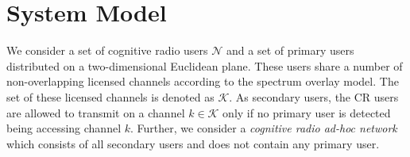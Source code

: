 \documentclass[10pt,journal,compsoc]{IEEEtran}
\theoremstyle{mytheoremstyle}
\theoremstyle{mytheoremstyle}
\theoremstyle{mytheoremstyle}
\begin{document}
\section{System Model}
\label{sec:model}

We consider a set of cognitive radio users $\mathcal{N}$ and a set of primary users distributed on a two-dimensional Euclidean plane.
These users share a number of non-overlapping licensed channels according to the spectrum overlay model. 
The set of these licensed channels is denoted as $\mathcal{K}$. 
As secondary users, the CR users are allowed to transmit on a channel $k \in \mathcal{K}$ only if no primary user is detected being accessing channel $k$. 
Further, we consider a \textit{cognitive radio ad-hoc network} which consists of all secondary users and does not contain any primary user.

\end{document}
